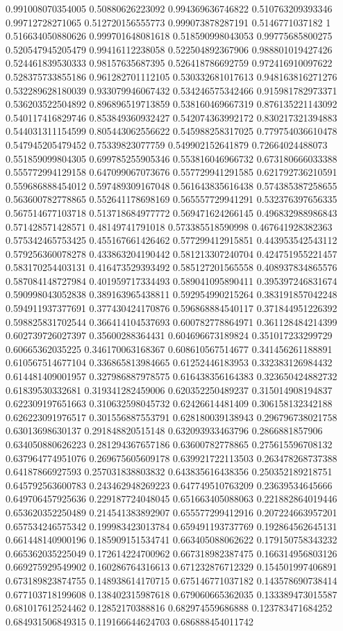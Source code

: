 \begin{table}
\begin{tabu}
\begin{sparkline}{10}
0.991008070354005 0.50880626223092 0.994369636746822 0.510763209393346 0.99712728271065 0.512720156555773 0.999073878287191 0.5146771037182 1 0.516634050880626 0.999701648081618 0.518590998043053 0.99775685800275 0.520547945205479 0.99416112238058 0.522504892367906 0.988801019427426 0.524461839530333 0.98157635687395 0.526418786692759 0.972416910097622 0.528375733855186 0.961282701112105 0.530332681017613 0.948163816271276 0.532289628180039 0.933079946067432 0.534246575342466 0.915981782973371 0.536203522504892 0.896896519713859 0.538160469667319 0.876135221143092 0.540117416829746 0.853849360932427 0.542074363992172 0.830217321394883 0.544031311154599 0.805443062556622 0.545988258317025 0.779754036610478 0.547945205479452 0.75339823077759 0.549902152641879 0.72664024488073 0.551859099804305 0.699785255905346 0.553816046966732 0.673180666033388 0.555772994129158 0.647099067073676 0.557729941291585 0.621792736210591 0.559686888454012 0.597489309167048 0.561643835616438 0.574385387258655 0.563600782778865 0.552641178698169 0.565557729941291 0.532376397656335 0.567514677103718 0.513718684977772 0.569471624266145 0.496832988986843 0.571428571428571 0.48149741791018 0.573385518590998 0.467641928382363 0.575342465753425 0.455167661426462 0.577299412915851 0.443953542543112 0.579256360078278 0.433863204190442 0.581213307240704 0.424751955221457 0.583170254403131 0.416473529393492 0.585127201565558 0.408937834865576 0.587084148727984 0.401959717334493 0.589041095890411 0.395397246831674 0.590998043052838 0.389163965438811 0.592954990215264 0.383191857042248 0.594911937377691 0.377430424170876 0.596868884540117 0.371844951226392 0.598825831702544 0.366414104537693 0.600782778864971 0.361128484214399 0.602739726027397 0.35600288364431 0.604696673189824 0.351017233299729 0.60665362035225 0.346170063168367 0.608610567514677 0.341456261188891 0.610567514677104 0.336865813984665 0.61252446183953 0.332383126984432 0.614481409001957 0.327986887978575 0.616438356164383 0.323650424882732 0.61839530332681 0.319341282459006 0.620352250489237 0.315014908194837 0.622309197651663 0.310632598045732 0.62426614481409 0.306158132342188 0.626223091976517 0.301556887553791 0.628180039138943 0.296796738021758 0.63013698630137 0.291848820515148 0.632093933463796 0.2866881857906 0.634050880626223 0.281294367657186 0.63600782778865 0.275615596708132 0.637964774951076 0.269675605609178 0.639921722113503 0.263478268737388 0.64187866927593 0.257031838803832 0.643835616438356 0.250352189218751 0.645792563600783 0.243462948269223 0.647749510763209 0.23639534645666 0.649706457925636 0.229187724048045 0.651663405088063 0.221882864019446 0.653620352250489 0.214541383892907 0.655577299412916 0.207224663957201 0.657534246575342 0.199983423013784 0.659491193737769 0.192864562645131 0.661448140900196 0.185909151534741 0.663405088062622 0.179150758343232 0.665362035225049 0.172614224700962 0.667318982387475 0.166314956803126 0.669275929549902 0.160286764316613 0.671232876712329 0.154501997406891 0.673189823874755 0.148938614170715 0.675146771037182 0.143578690738414 0.677103718199608 0.138402315987618 0.679060665362035 0.133389473015587 0.681017612524462 0.12852170388816 0.682974559686888 0.123783471684252 0.684931506849315 0.119166644624703 0.686888454011742 
\end{sparkline}
\end{tabu}
\end{table}
